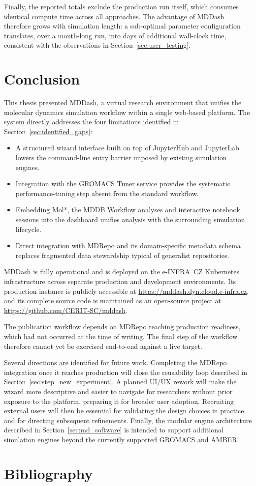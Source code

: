 \documentclass[
  digital,     %
  color,       %
  oneside,     %
  nosansbold,  %
  nocolorbold, %
  lof,         %
  lot,         %
]{fithesis4}
\begin{document}
Finally, the reported totals exclude the production run itself, which consumes identical compute time across all approaches. The advantage of MDDash therefore grows with simulation length: a sub-optimal parameter configuration translates, over a month-long run, into days of additional wall-clock time, consistent with the observations in Section~\ref{sec:user_testing}.


\chapter{Conclusion}

This thesis presented MDDash, a virtual research environment that unifies the molecular dynamics simulation workflow within a single web-based platform. The system directly addresses the four limitations identified in Section~\ref{sec:identified_gaps}:

\begin{itemize}
    \item A structured wizard interface built on top of JupyterHub and JupyterLab lowers the command-line entry barrier imposed by existing simulation engines.
    \item Integration with the GROMACS Tuner service provides the systematic performance-tuning step absent from the standard workflow.
    \item Embedding Mol*, the MDDB Workflow analyses and interactive notebook sessions into the dashboard unifies analysis with the surrounding simulation lifecycle.
    \item Direct integration with MDRepo and its domain-specific metadata schema replaces fragmented data stewardship typical of generalist repositories.
\end{itemize}

MDDash is fully operational and is deployed on the e-INFRA~CZ Kubernetes infrastructure across separate production and development environments. Its production instance is publicly accessible at \url{https://mddash.dyn.cloud.e-infra.cz}, and its complete source code is maintained as an open-source project at \url{https://github.com/CERIT-SC/mddash}.

The publication workflow depends on MDRepo reaching production readiness, which had not occurred at the time of writing. The final step of the workflow therefore cannot yet be exercised end-to-end against a live target.

Several directions are identified for future work. Completing the MDRepo integration once it reaches production will close the reusability loop described in Section~\ref{sec:step_new_experiment}. A planned UI/UX rework will make the wizard more descriptive and easier to navigate for researchers without prior exposure to the platform, preparing it for broader user adoption. Recruiting external users will then be essential for validating the design choices in practice and for directing subsequent refinements. Finally, the modular engine architecture described in Section~\ref{sec:md_software} is intended to support additional simulation engines beyond the currently supported GROMACS and AMBER.

\chapter*{Bibliography}

\printbibliography[heading=none]
\end{document}
